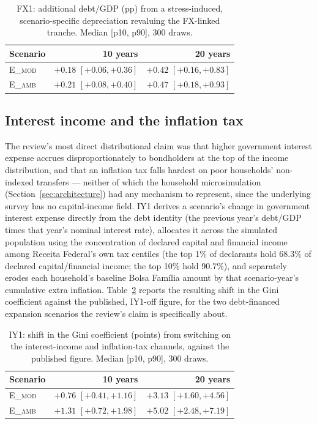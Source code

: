 \documentclass[11pt,a4paper]{article}
\begin{document}
\begin{table}[htbp]
\centering\small
\caption{FX1: additional debt/GDP (pp) from a stress-induced, scenario-specific depreciation revaluing the FX-linked tranche. Median [p10, p90], 300 draws.}
\label{tab:fx1}
\begin{tabular}{lrr}
\toprule
Scenario & 10 years & 20 years \\
\midrule
\textsc{E\_mod} & $+0.18$ $[+0.06,+0.36]$ & $+0.42$ $[+0.16,+0.83]$ \\
\textsc{E\_amb} & $+0.21$ $[+0.08,+0.40]$ & $+0.47$ $[+0.18,+0.93]$ \\
\bottomrule
\end{tabular}
\end{table}

\subsection{Interest income and the inflation tax}

The review's most direct distributional claim was that higher government interest expense accrues disproportionately to bondholders at the top of the income distribution, and that an inflation tax falls hardest on poor households' non-indexed transfers --- neither of which the household microsimulation (Section~\ref{sec:architecture}) had any mechanism to represent, since the underlying survey has no capital-income field. IY1 derives a scenario's change in government interest expense directly from the debt identity (the previous year's debt/GDP times that year's nominal interest rate), allocates it across the simulated population using the concentration of declared capital and financial income among Receita Federal's own tax centiles \citep{receitafederal2024} (the top 1\% of declarants hold 68.3\% of declared capital/financial income; the top 10\% hold 90.7\%), and separately erodes each household's baseline Bolsa Fam\'ilia amount by that scenario-year's cumulative extra inflation. Table~\ref{tab:iy1} reports the resulting shift in the Gini coefficient against the published, IY1-off figure, for the two debt-financed expansion scenarios the review's claim is specifically about.

\begin{table}[htbp]
\centering\small
\caption{IY1: shift in the Gini coefficient (points) from switching on the interest-income and inflation-tax channels, against the published figure. Median [p10, p90], 300 draws.}
\label{tab:iy1}
\begin{tabular}{lrr}
\toprule
Scenario & 10 years & 20 years \\
\midrule
\textsc{E\_mod} & $+0.76$ $[+0.41,+1.16]$ & $+3.13$ $[+1.60,+4.56]$ \\
\textsc{E\_amb} & $+1.31$ $[+0.72,+1.98]$ & $+5.02$ $[+2.48,+7.19]$ \\
\bottomrule
\end{tabular}
\end{table}
\end{document}
